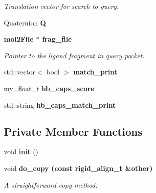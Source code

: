 \begin{CompactItemize}
\begin{CompactList}\small\item\em Translation vector for search to query. \item\end{CompactList}\item 
Quaternion \textbf{Q}\label{classSimSite3D_1_1rigid__align__t_ffd3c5b8182230bf24cc1ae954039360}

\item 
\bf{mol2File} $\ast$ \bf{frag\_\-file}\label{classSimSite3D_1_1rigid__align__t_be34b21f5d3ef687d3e9213aca149eb6}

\begin{CompactList}\small\item\em Pointer to the ligand fragment in query pocket. \item\end{CompactList}\item 
std::vector$<$ bool $>$ \textbf{match\_\-print}\label{classSimSite3D_1_1rigid__align__t_21450c7e527409561c1eaee7f46bf922}

\item 
my\_\-float\_\-t \textbf{hb\_\-caps\_\-score}\label{classSimSite3D_1_1rigid__align__t_956a632cdccaa9096759d9c1d38c6026}

\item 
std::string \textbf{hb\_\-caps\_\-match\_\-print}\label{classSimSite3D_1_1rigid__align__t_bd736c82ab7b0c5704c58fd85ca836a1}

\end{CompactItemize}
\subsection*{Private Member Functions}
\begin{CompactItemize}
\item 
void \textbf{init} ()\label{classSimSite3D_1_1rigid__align__t_19b9ab1fc878784b26ed6bf7a5d2338f}

\item 
void \bf{do\_\-copy} (const \bf{rigid\_\-align\_\-t} \&other)\label{classSimSite3D_1_1rigid__align__t_ab8efcf8e3820a7e91cd135acef58c84}

\begin{CompactList}\small\item\em A straightforward copy method. \item\end{CompactList}\end{CompactItemize}


